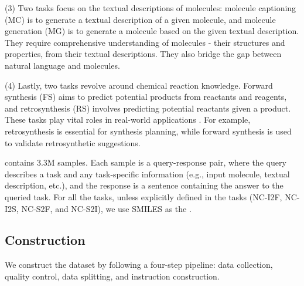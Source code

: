 (3) Two tasks focus on the textual descriptions of molecules: {molecule captioning} (MC) is to generate a textual description of a given molecule, and {molecule generation} (MG) is to generate a molecule based on the given textual description. They require comprehensive understanding of molecules - their structures and properties, from their textual descriptions. %
They also bridge the gap between natural language and molecules.

(4) Lastly, two tasks revolve around chemical reaction knowledge. {Forward synthesis} (FS) aims to predict potential products from reactants and reagents, and {retrosynthesis} (RS) involves predicting potential reactants given a product. These tasks play vital roles in real-world applications \citep{Coley2018}. For example, retrosynthesis is essential for synthesis planning, %
while forward synthesis is used to validate retrosynthetic suggestions.

\datasetname contains 3.3M samples. Each sample is a query-response pair, where the query describes a task and any task-specific information (e.g., input molecule, textual description, etc.), and the response is a sentence containing the answer to the queried task. For all the tasks, unless explicitly defined in the tasks (NC-I2F, NC-I2S, NC-S2F, and NC-S2I), we use {SMILES} as the .

\subsection{\datasetname Construction}
\label{subsec:data_construction}

We construct the \datasetname dataset by following a four-step pipeline: data collection, quality control, data splitting, and instruction construction.

